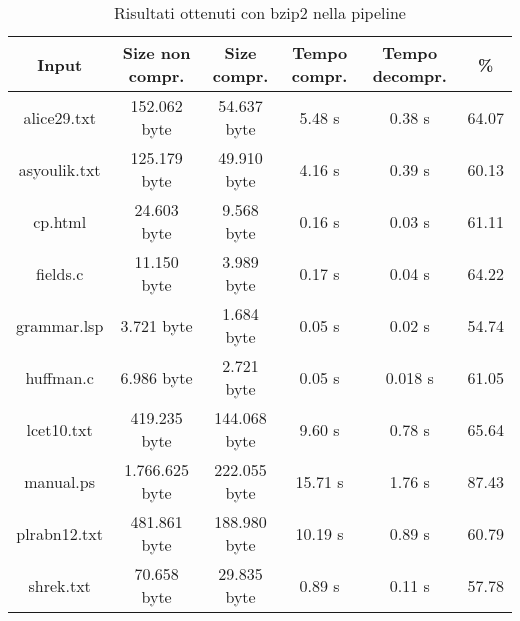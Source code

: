     \begin{table}
    \begin{tabular}{||c c c c c c||} 
     \hline
     Input & Size non compr. & Size compr. & Tempo compr. & Tempo decompr. & \% \\ [0.5ex] 
     \hline\hline
     alice29.txt & 152.062 byte & 54.637 byte & 5.48 s & 0.38 s & 64.07\\ [1ex]
     \hline
     asyoulik.txt & 125.179 byte & 49.910 byte & 4.16 s & 0.39 s & 60.13\\ [1ex] 
     \hline
     cp.html & 24.603 byte & 9.568 byte & 0.16 s & 0.03 s & 61.11\\ [1ex] 
     \hline
     fields.c & 11.150 byte & 3.989 byte & 0.17 s & 0.04 s & 64.22\\ [1ex]
     \hline
     grammar.lsp & 3.721 byte & 1.684 byte & 0.05 s & 0.02 s & 54.74\\ [1ex] 
     \hline
     huffman.c & 6.986 byte & 2.721 byte & 0.05 s & 0.018 s & 61.05\\ [1ex]
     \hline
     lcet10.txt & 419.235 byte & 144.068 byte & 9.60 s & 0.78 s & 65.64\\ [1ex] 
     \hline
     manual.ps & 1.766.625 byte & 222.055 byte & 15.71 s & 1.76 s & 87.43\\ 
 [1ex]
     \hline
     plrabn12.txt & 481.861 byte & 188.980 byte & 10.19 s & 0.89 s & 60.79\\ [1ex] 
     \hline
     shrek.txt & 70.658 byte & 29.835 byte & 0.89 s & 0.11 s & 57.78\\ [1ex]

     \hline
    \end{tabular} 
    \caption{Risultati ottenuti con bzip2 nella pipeline\label{tab:bz2pipeline}}
    \end{table}

